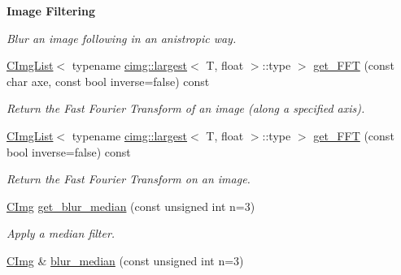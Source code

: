 \begin{Indent}{\bf Image Filtering}
\begin{DoxyCompactItemize}
\begin{DoxyCompactList}\small\item\em Blur an image following in an anistropic way. \item\end{DoxyCompactList}\item 
\hypertarget{structcimg__library_1_1_c_img_a2639069ab358008f2168381e2bc04d75}{
\hyperlink{structcimg__library_1_1_c_img_list}{CImgList}$<$ typename \hyperlink{structcimg__library_1_1cimg_1_1largest}{cimg::largest}$<$ T, float $>$::type $>$ \hyperlink{structcimg__library_1_1_c_img_a2639069ab358008f2168381e2bc04d75}{get\_\-FFT} (const char axe, const bool inverse=false) const }
\label{structcimg__library_1_1_c_img_a2639069ab358008f2168381e2bc04d75}

\begin{DoxyCompactList}\small\item\em Return the Fast Fourier Transform of an image (along a specified axis). \item\end{DoxyCompactList}\item 
\hypertarget{structcimg__library_1_1_c_img_aad4e7a99f38686b4d399b2afe7ca2d1f}{
\hyperlink{structcimg__library_1_1_c_img_list}{CImgList}$<$ typename \hyperlink{structcimg__library_1_1cimg_1_1largest}{cimg::largest}$<$ T, float $>$::type $>$ \hyperlink{structcimg__library_1_1_c_img_aad4e7a99f38686b4d399b2afe7ca2d1f}{get\_\-FFT} (const bool inverse=false) const }
\label{structcimg__library_1_1_c_img_aad4e7a99f38686b4d399b2afe7ca2d1f}

\begin{DoxyCompactList}\small\item\em Return the Fast Fourier Transform on an image. \item\end{DoxyCompactList}\item 
\hypertarget{structcimg__library_1_1_c_img_a9f31f9c2980b27d89c5df322807a7a3e}{
\hyperlink{structcimg__library_1_1_c_img}{CImg} \hyperlink{structcimg__library_1_1_c_img_a9f31f9c2980b27d89c5df322807a7a3e}{get\_\-blur\_\-median} (const unsigned int n=3)}
\label{structcimg__library_1_1_c_img_a9f31f9c2980b27d89c5df322807a7a3e}

\begin{DoxyCompactList}\small\item\em Apply a median filter. \item\end{DoxyCompactList}\item 
\hypertarget{structcimg__library_1_1_c_img_aec66b5c98d17186d69b1042d5925a45a}{
\hyperlink{structcimg__library_1_1_c_img}{CImg} \& \hyperlink{structcimg__library_1_1_c_img_aec66b5c98d17186d69b1042d5925a45a}{blur\_\-median} (const unsigned int n=3)}
\label{structcimg__library_1_1_c_img_aec66b5c98d17186d69b1042d5925a45a}


\end{DoxyCompactItemize}
\end{Indent}
